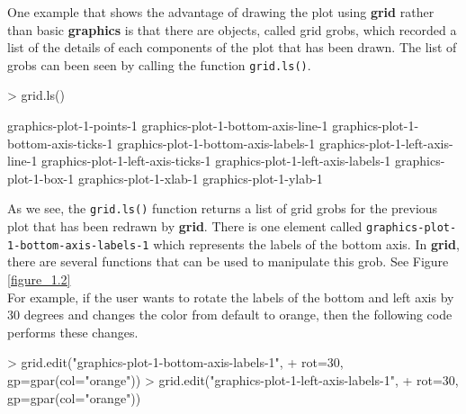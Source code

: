 \documentclass[paper=a4, fontsize=11pt]{report}
\begin{document}
One example that shows the advantage of drawing the plot using \textbf{grid} rather than basic \textbf{graphics} is that there are objects, called grid grobs, which recorded a list of the details of each components of the plot that has been drawn. The list of grobs can been seen by calling the function \texttt{grid.ls()}. \\
\begin{Schunk}
\begin{Sinput}
> grid.ls()
\end{Sinput}
\begin{Soutput}
graphics-plot-1-points-1
graphics-plot-1-bottom-axis-line-1
graphics-plot-1-bottom-axis-ticks-1
graphics-plot-1-bottom-axis-labels-1
graphics-plot-1-left-axis-line-1
graphics-plot-1-left-axis-ticks-1
graphics-plot-1-left-axis-labels-1
graphics-plot-1-box-1
graphics-plot-1-xlab-1
graphics-plot-1-ylab-1
\end{Soutput}
\end{Schunk}


As we see, the \texttt{grid.ls()} function returns a list of grid grobs for the previous plot that has been redrawn by \textbf{grid}. There is one element called \texttt{graphics-plot-1-bottom-axis-labels-1} which represents the labels of the bottom axis. In \textbf{grid}, there are several functions that can be used to manipulate this grob. See Figure \ref{figure_1.2} \\

For example, if the user wants to rotate the labels of the bottom and left axis by 30 degrees and changes the color from default to orange, then the following code performs these changes.
\begin{Schunk}
\begin{Sinput}
> grid.edit("graphics-plot-1-bottom-axis-labels-1", 
+           rot=30, gp=gpar(col="orange"))
> grid.edit("graphics-plot-1-left-axis-labels-1", 
+           rot=30, gp=gpar(col="orange"))
\end{Sinput}
\end{Schunk}
\end{document}
